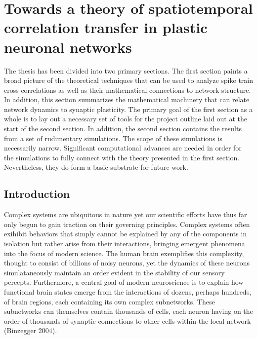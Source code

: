 \documentclass{ucetd}
\begin{document}
\mainmatter

\chapter{Towards a theory of spatiotemporal correlation transfer in plastic neuronal networks}

The thesis has been divided into two primary sections. The first section paints a broad picture of the theoretical techniques that can be used to analyze spike train cross correlations as well as their mathematical connections to network structure. In addition, this section summarizes the mathematical machinery that can relate network dynamics to synaptic plasticity. The primary goal of the first section as a whole is to lay out a necessary set of tools for the project outline laid out at the start of the second section. In addition, the second section contains the results from a set of rudimentary simulations. The scope of these simulations is necessarily narrow. Significant computational advances are needed in order for the simulations to fully connect with the theory presented in the first section. Nevertheless, they do form a basic substrate for future work.

\section{Introduction}

Complex systems are ubiquitous in nature yet our scientific efforts have thus far only begun to gain traction on their governing principles. Complex systems often exihibit behaviors that simply cannot be explained by any of the components in isolation but rather arise from their interactions, bringing emergent phenomena into the focus of modern science. The human brain exemplifies this complexity, thought to consist of billions of noisy neurons, yet the dynamics of these neurons simulataneously maintain an order evident in the stability of our sensory percepts. Furthermore, a central goal of modern neuroscience is to explain how functional brain states emerge from the interactions of dozens, perhaps hundreds, of brain regions, each containing its own complex subnetworks.  These subnetworks can themselves contain thousands of cells, each neuron having on the order of thousands of synaptic connections to other cells within the local network (Binzegger 2004).
\end{document}
